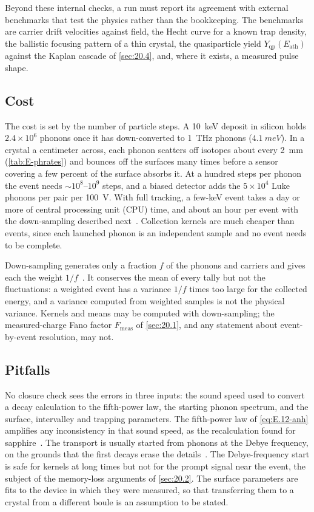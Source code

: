 Beyond these internal checks, a run must report its agreement with external benchmarks that test the physics rather than the bookkeeping. The benchmarks are carrier drift velocities against field, the Hecht curve for a known trap density, the ballistic focusing pattern of a thin crystal, the quasiparticle yield $Y_{\mathrm{qp}}(E_{\mathrm{ath}})$ against the Kaplan cascade of \cref{sec:20.4}, and, where it exists, a measured pulse shape.

\subsection{Cost}

The cost is set by the number of particle steps. A \SI{10}{keV} deposit in silicon holds $2.4\times10^6$ phonons once it has down-converted to \SI{1}{THz} phonons ($\SI{4.1}{meV}$). In a crystal a centimeter across, each phonon scatters off isotopes about every \SI{2}{mm} (\cref{tab:E-phrates}) and bounces off the surfaces many times before a sensor covering a few percent of the surface absorbs it. At a hundred steps per phonon the event needs $\sim10^8$--$10^9$ steps, and a biased detector adds the $5\times10^4$ Luke phonons per pair per \SI{100}{V}. With full tracking, a few-keV event takes a day or more of central processing unit (CPU) time, and about an hour per event with the down-sampling described next~\cite[Sect.~3.4 and Fig.~8]{kelsey2023g4cmp}. Collection kernels are much cheaper than events, since each launched phonon is an independent sample and no event needs to be complete.

Down-sampling generates only a fraction $f$ of the phonons and carriers and gives each the weight $1/f$~\cite[Sect.~3.4]{kelsey2023g4cmp}. It conserves the mean of every tally but not the fluctuations: a weighted event has a variance $1/f$ times too large for the collected energy, and a variance computed from weighted samples is not the physical variance. Kernels and means may be computed with down-sampling; the measured-charge Fano factor $F_{\mathrm{meas}}$ of \cref{sec:20.1}, and any statement about event-by-event resolution, may not.

\subsection{Pitfalls}

No closure check sees the errors in three inputs: the sound speed used to convert a decay calculation to the fifth-power law, the starting phonon spectrum, and the surface, intervalley and trapping parameters. The fifth-power law of \cref{eq:E.12-anh} amplifies any inconsistency in that sound speed, as the recalculation found for sapphire~\cite[Sect.~3.1]{hernandez2025modeling}. The transport is usually started from phonons at the Debye frequency, on the grounds that the first decays erase the details~\cite[Sect.~III\,B]{leman2012invited}. The Debye-frequency start is safe for kernels at long times but not for the prompt signal near the event, the subject of the memory-loss arguments of \cref{sec:20.2}. The surface parameters are fits to the device in which they were measured, so that transferring them to a crystal from a different boule is an assumption to be stated.

